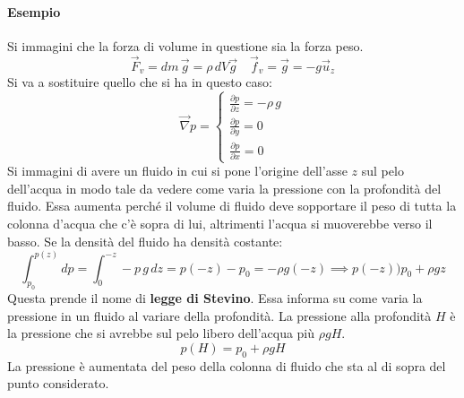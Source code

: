 \documentclass[10pt,a4paper]{book}
\begin{document}
\paragraph{Esempio} Si immagini che la forza di volume in questione sia la forza peso.
\[
	\vec{F}_v = dm\,\vec{g} = \rho\,dV\vec{g}  \quad \vec{f}_v = \vec{g} = -g\vec{u}_z
\]
Si va a sostituire quello che si ha in questo caso:
\[
	\vec{\nabla} p = \left\{ \begin{array}{l}
	 	\frac{\partial p}{\partial z} = -\rho\,g \\
	 	\frac{\partial p}{\partial y} = 0 \\
	 	\frac{\partial p}{\partial x} = 0
	\end{array} \right.
\]
Si immagini di avere un fluido in cui si pone l'origine dell'asse $z$ sul pelo dell'acqua in modo tale da vedere come varia la pressione con la profondità del fluido. Essa aumenta perché il volume di fluido deve sopportare il peso di tutta la colonna d'acqua che c'è sopra di lui, altrimenti l'acqua si muoverebbe verso il basso. Se la densità del fluido ha densità costante:
\[
	\int_{p_0 }^{p(z)} dp = \int_0^{-z} -p\,g\,dz= p(-z) - p_0= -\rho g(-z) \implies p(-z) ) p_0 + \rho gz
\]
Questa prende il nome di \textbf{legge di Stevino}. Essa informa su come varia la pressione in un fluido al variare della profondità. La pressione alla profondità $H$ è la pressione che si avrebbe sul pelo libero dell'acqua più $\rho g H$.
\[
	\boxed{p(H) = p_0 + \rho gH}
\]
La pressione è aumentata del peso della colonna di fluido che sta al di sopra del punto considerato.
\end{document}
